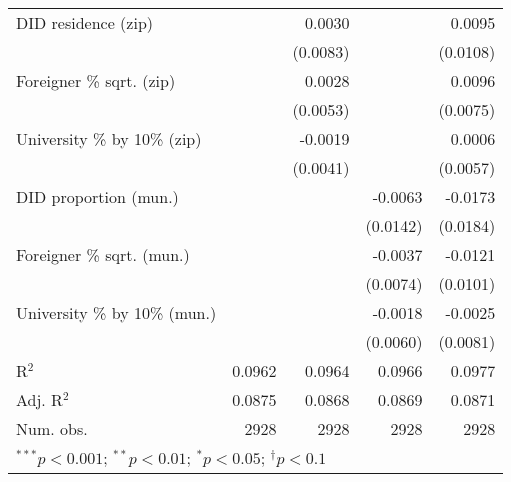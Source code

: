 \begin{tabular}{l D{.}{.}{4.11} D{.}{.}{4.11} D{.}{.}{4.11} D{.}{.}{4.11}}
DID residence (zip)               &                  & 0.0030           &                  & 0.0095           \\
                                  &                  & (0.0083)         &                  & (0.0108)         \\
Foreigner \% sqrt. (zip)          &                  & 0.0028           &                  & 0.0096           \\
                                  &                  & (0.0053)         &                  & (0.0075)         \\
University \% by 10\% (zip)       &                  & -0.0019          &                  & 0.0006           \\
                                  &                  & (0.0041)         &                  & (0.0057)         \\
DID proportion (mun.)             &                  &                  & -0.0063          & -0.0173          \\
                                  &                  &                  & (0.0142)         & (0.0184)         \\
Foreigner \% sqrt. (mun.)         &                  &                  & -0.0037          & -0.0121          \\
                                  &                  &                  & (0.0074)         & (0.0101)         \\
University \% by 10\% (mun.)      &                  &                  & -0.0018          & -0.0025          \\
                                  &                  &                  & (0.0060)         & (0.0081)         \\
\midrule
R$^2$                             & 0.0962           & 0.0964           & 0.0966           & 0.0977           \\
Adj. R$^2$                        & 0.0875           & 0.0868           & 0.0869           & 0.0871           \\
Num. obs.                         & 2928             & 2928             & 2928             & 2928             \\
\bottomrule
{}
\end{tabular}
